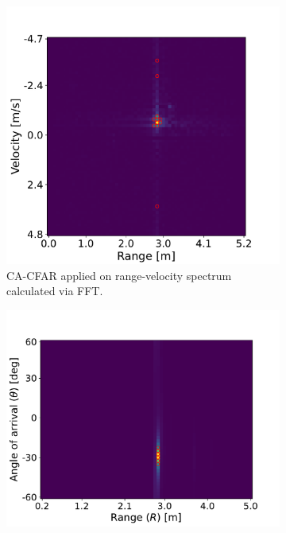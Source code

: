 \begin{figure}[H]
    \centering
    \begin{subfigure}{0.49\textwidth}
        \centering
        \includegraphics[width=\textwidth]{fig/4/ca-cfar-fft.pdf}
        \caption{CA-CFAR applied on range-velocity spectrum calculated via FFT.}
        \label{fig:ca-cfar-fft}
    \end{subfigure}
    \hfill
    \begin{subfigure}{0.49\textwidth}
        \centering
        \includegraphics[width=\textwidth]{fig/4/ca-cfar-music.pdf}

\end{subfigure}
\end{figure}
